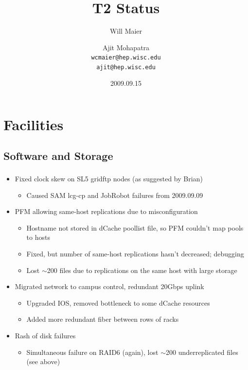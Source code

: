 \documentclass{beamer}
\title{T2 Status}
\author[Maier, Mohapatra]{
    Will Maier \and Ajit Mohapatra\\ 
    {\tt wcmaier@hep.wisc.edu}\\
    {\tt ajit@hep.wisc.edu}}
\institute[Wisconsin]{University of Wisconsin - High Energy Physics}
\date{2009.09.15}
\newcommand{\ca}{\ensuremath{\sim}}
\begin{document}
\begin{frame}
    \titlepage
\end{frame}


\section{Facilities}
\subsection{Software and Storage}
\begin{frame}
\frametitle{}

\begin{itemize}
	\item Fixed clock skew on SL5 gridftp nodes (as suggested by Brian)
	\begin{itemize}
		\item Caused SAM lcg-cp and JobRobot failures from 2009.09.09
	\end{itemize}
	\item PFM allowing same-host replications due to misconfiguration
	\begin{itemize}
		\item Hostname not stored in dCache poollist file, so PFM couldn't map pools to hosts
		\item Fixed, but number of same-host replications hasn't decreased; debugging
		\item Lost \ca{}200 files due to replications on the same host with large storage
	\end{itemize}
	\item Migrated network to campus control, redundant 20Gbps uplink
	\begin{itemize}
		\item Upgraded IOS, removed bottleneck to some dCache resources
		\item Added more redundant fiber between rows of racks
	\end{itemize}
	\item Rash of disk failures
	\begin{itemize}
		\item Simultaneous failure on RAID6 (again), lost \ca{}200 underreplicated files (see above)
	\end{itemize}
\end{itemize}

\end{frame}
\end{document}
